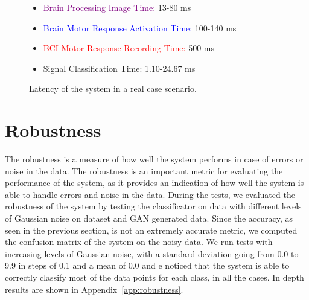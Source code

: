 \begin{figure}[!htbp]
{
    }
    \begin{itemize}
        \item \textcolor{purple}{Brain Processing Image Time:} 13-80 ms
        \item \textcolor{blue}{Brain Motor Response Activation Time:} 100-140 ms
        \item \textcolor{red}{BCI Motor Response Recording Time:} 500 ms
        \item \textcolor{amethyst}{Signal Classification Time:} 1.10-24.67 ms
    \end{itemize}
    \caption{Latency of the system in a real case scenario.}\label{fig:latency}
\end{figure}

\section{Robustness}
The robustness is a measure of how well the system performs in case of errors or noise in the data.
The robustness is an important metric for evaluating the performance of the system, as it provides an indication of how well the system is able to handle errors and noise in the data.
During the tests, we evaluated the robustness of the system by testing the classificator on data with different levels of Gaussian noise on dataset and GAN generated data.
Since the accuracy, as seen in the previous section, is not an extremely accurate metric, we computed the confusion matrix of the system on the noisy data.
We run tests with increasing levels of Gaussian noise, with a standard deviation going from 0.0 to 9.9 in steps of 0.1 and a mean of 0.0 and e noticed that the system is able to correctly classify most of the data points for each class, in all the cases.
In depth results are shown in Appendix~\ref{app:robustness}.

